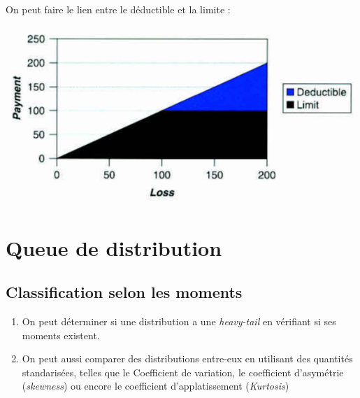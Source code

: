 \documentclass[12pt, french]{report}
\begin{document}
\begin{exemple}
On peut faire le lien entre le déductible et la limite : 
\begin{center}
\includegraphics[scale=0.45]{Figures/distinction_loss-deductible-limit}
\end{center}
\end{exemple}

\setcounter{section}{3}
%
%
%

\section{Queue de distribution}
\subsection{Classification selon les moments}
\begin{enumerate}[label=\faAngleRight]
\item On peut déterminer si une distribution a une \textit{heavy-tail} en vérifiant si ses moments existent.

\item On peut aussi comparer des distributions entre-eux en utilisant des quantités standarisées, telles que le Coefficient de variation, le coefficient d'asymétrie (\textit{skewness}) ou encore le coefficient d'applatissement (\textit{Kurtosis})
\end{enumerate}
\end{document}

